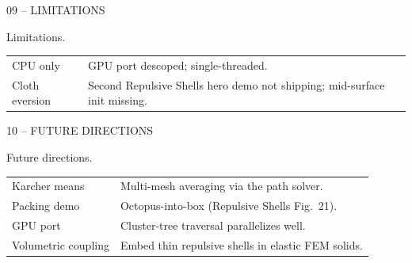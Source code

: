\documentclass[aspectratio=169,14pt]{beamer}
\newcommand{\decklabel}[1]{%
  {\fontsize{8.5}{11}\selectfont\color{Label}\MakeUppercase{#1}\par}%
}
\newcommand{\slidetitle}[1]{%
  {\fontsize{25}{30}\selectfont\color{Text}\raggedright #1\par}%
}
\newcommand{\steplabel}[1]{%
  {\fontsize{9}{11}\selectfont\color{Text}#1\par}%
}
\newcommand{\stepbody}[1]{%
  {\fontsize{9.5}{12.0}\selectfont\color{Dim}\raggedright #1\par}%
}
\begin{document}
\begin{frame}[plain]
  \vspace*{0.45cm}
  \hspace*{1.22cm}
  \begin{minipage}{0.82\paperwidth}
  \raggedright
  \decklabel{09 -- Limitations}
  \vspace{0.10cm}
  \slidetitle{Limitations.}
  \vspace{0.15cm}

  \renewcommand{\arraystretch}{1.4}
  \setlength{\tabcolsep}{4pt}
  \begin{tabular}{@{}p{3.4cm}p{9.2cm}@{}}
    \steplabel{CPU only} &
    \stepbody{GPU port descoped; single-threaded.} \\
    \steplabel{Cloth eversion} &
    \stepbody{Second Repulsive Shells hero demo not shipping; mid-surface init missing.} \\
  \end{tabular}
  \end{minipage}
\end{frame}

\begin{frame}[plain]
  \vspace*{0.30cm}
  \hspace*{1.22cm}
  \begin{minipage}{0.82\paperwidth}
  \raggedright
  \decklabel{10 -- Future directions}
  \vspace{0.05cm}
  \slidetitle{Future directions.}
  \vspace{0.10cm}

  \renewcommand{\arraystretch}{1.0}
  \setlength{\tabcolsep}{4pt}
  \begin{tabular}{@{}p{3.4cm}p{9.2cm}@{}}
    \steplabel{Karcher means} &
    \stepbody{Multi-mesh averaging via the path solver.} \\
    \steplabel{Packing demo} &
    \stepbody{Octopus-into-box (Repulsive Shells Fig.\ 21).} \\
    \steplabel{GPU port} &
    \stepbody{Cluster-tree traversal parallelizes well.} \\
    \steplabel{Volumetric coupling} &
    \stepbody{Embed thin repulsive shells in elastic FEM solids.} \\
  \end{tabular}
  \end{minipage}
\end{frame}
\end{document}
